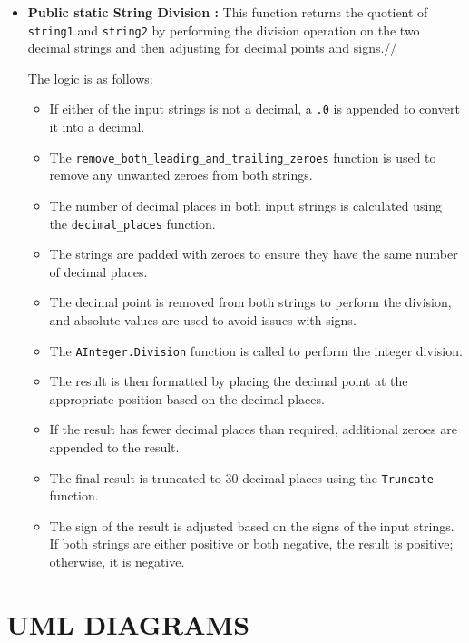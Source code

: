 \documentclass{article}
\begin{document}
\begin{itemize}
\item \textbf{Public static String Division :} 
This function returns the quotient of \texttt{string1} and \texttt{string2} by performing the division operation on the two decimal strings and then adjusting for decimal points and signs.//

The logic is as follows:
\begin{itemize}
    \item If either of the input strings is not a decimal, a \texttt{.0} is appended to convert it into a decimal.
    \item The \texttt{remove\_both\_leading\_and\_trailing\_zeroes} function is used to remove any unwanted zeroes from both strings.
    \item The number of decimal places in both input strings is calculated using the \texttt{decimal\_places} function.
    \item The strings are padded with zeroes to ensure they have the same number of decimal places.
    \item The decimal point is removed from both strings to perform the division, and absolute values are used to avoid issues with signs.
    \item The \texttt{AInteger.Division} function is called to perform the integer division.
    \item The result is then formatted by placing the decimal point at the appropriate position based on the decimal places.
    \item If the result has fewer decimal places than required, additional zeroes are appended to the result.
    \item The final result is truncated to 30 decimal places using the \texttt{Truncate} function.
    \item The sign of the result is adjusted based on the signs of the input strings. If both strings are either positive or both negative, the result is positive; otherwise, it is negative.
\end{itemize}
\end{itemize}
\section{UML DIAGRAMS}
\end{document}
